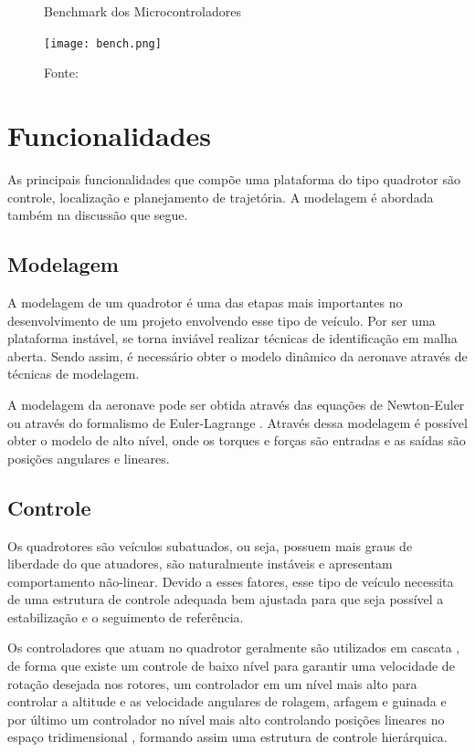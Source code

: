 \begin{figure} [h!]	
  \centering
  \caption{Benchmark dos Microcontroladores}
  \texttt{[image: bench.png]}
  \caption*{Fonte: \cite{benchmark}}
  \label{fig:BILI}
\end{figure}

\section{Funcionalidades}

As principais funcionalidades que compõe uma plataforma do tipo quadrotor são controle, localização e planejamento de trajetória. A modelagem é abordada também na discussão que segue.

\subsection{Modelagem}
A modelagem de um quadrotor é uma das etapas mais importantes no desenvolvimento de um projeto envolvendo esse tipo de veículo. Por ser uma plataforma instável, se torna inviável realizar técnicas de identificação em malha aberta. Sendo assim, é necessário obter o modelo dinâmico da aeronave através de técnicas de modelagem.

A modelagem da aeronave pode ser obtida através das equações de Newton-Euler ou através do formalismo de Euler-Lagrange \cite{castillo2005modelling} . Através dessa modelagem é possível obter o modelo de alto nível, onde os torques e forças são entradas e as saídas são posições angulares e lineares. 

\subsection{Controle}
Os quadrotores são veículos subatuados, ou seja, possuem mais graus de liberdade do que atuadores, são naturalmente instáveis e apresentam comportamento não-linear. Devido a esses fatores, esse tipo de veículo necessita de uma estrutura de controle adequada bem ajustada para que seja possível a estabilização e o seguimento de referência.

Os controladores que atuam no quadrotor geralmente são utilizados em cascata \cite{Nonami2010a}, de forma que existe um controle de baixo nível para garantir uma velocidade de rotação desejada nos rotores, um controlador em um nível mais alto para controlar a altitude e as velocidade angulares de rolagem, arfagem e guinada e por último um controlador no nível mais alto controlando posições lineares no espaço tridimensional \cite{Kendoul2007}, formando assim uma estrutura de controle hierárquica.


